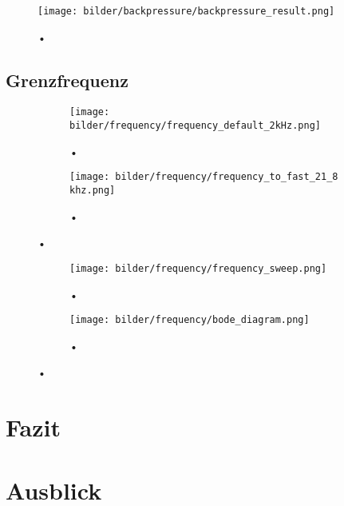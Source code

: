 \documentclass[fontsize=12pt, a4paper]{scrartcl}
\let\stdsection\section 	%
\renewcommand\section{\newpage\stdsection}
\begin{document}
\begin{figure}[H]
	\centering
	\texttt{[image: bilder/backpressure/backpressure\_result.png]}
	\caption{•}
\end{figure}

\subsection{Grenzfrequenz}

\begin{figure}[H]
    \centering
    \begin{subfigure}[H]{0.48\textwidth}
        \texttt{[image: bilder/frequency/frequency\_default\_2kHz.png]}
        \caption{•}
    \end{subfigure}
    \begin{subfigure}[H]{0.48\textwidth}
        \texttt{[image: bilder/frequency/frequency\_to\_fast\_21\_8 khz.png]}
        \caption{•}
    \end{subfigure}
    \caption{•}
\end{figure}

\begin{figure}[H]
    \centering
    \begin{subfigure}[H]{0.48\textwidth}
        \texttt{[image: bilder/frequency/frequency\_sweep.png]}
        \caption{•}
    \end{subfigure}
    \begin{subfigure}[H]{0.48\textwidth}
        \texttt{[image: bilder/frequency/bode\_diagram.png]}
        \caption{•}
    \end{subfigure}
    \caption{•}
\end{figure}

\section{Fazit}

\section{Ausblick}

\printbibliography
\end{document}
